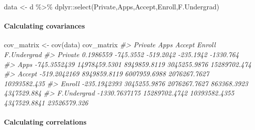 \documentclass[
]{article}
\newenvironment{Shaded}{\begin{snugshade}}{\end{snugshade}}
\newcommand{\CommentTok}[1]{\textcolor[rgb]{0.56,0.35,0.01}{\textit{#1}}}
\newcommand{\FunctionTok}[1]{\textcolor[rgb]{0.00,0.00,0.00}{#1}}
\newcommand{\NormalTok}[1]{#1}
\newcommand{\OtherTok}[1]{\textcolor[rgb]{0.56,0.35,0.01}{#1}}
\newcommand{\SpecialCharTok}[1]{\textcolor[rgb]{0.00,0.00,0.00}{#1}}
\newcommand{\StringTok}[1]{\textcolor[rgb]{0.31,0.60,0.02}{#1}}
\begin{document}
\begin{Shaded}
\begin{Highlighting}[]
\NormalTok{data }\OtherTok{\textless{}{-}}\NormalTok{ d }\SpecialCharTok{\%\textgreater{}\%}\NormalTok{ dplyr}\SpecialCharTok{::}\FunctionTok{select}\NormalTok{(}\StringTok{\textquotesingle{}Private\textquotesingle{}}\NormalTok{,}\StringTok{\textquotesingle{}Apps\textquotesingle{}}\NormalTok{,}\StringTok{\textquotesingle{}Accept\textquotesingle{}}\NormalTok{,}\StringTok{\textquotesingle{}Enroll\textquotesingle{}}\NormalTok{,}\StringTok{\textquotesingle{}F.Undergrad\textquotesingle{}}\NormalTok{)}
\end{Highlighting}
\end{Shaded}

\hypertarget{calculating-covariances}{%
\paragraph{Calculating covariances}\label{calculating-covariances}}

\begin{Shaded}
\begin{Highlighting}[]
\NormalTok{cov\_matrix }\OtherTok{\textless{}{-}} \FunctionTok{cov}\NormalTok{(data)}
\NormalTok{cov\_matrix}
\CommentTok{\#\textgreater{}                   Private          Apps        Accept       Enroll  F.Undergrad}
\CommentTok{\#\textgreater{} Private         0.1986559     {-}745.3552     {-}519.2042    {-}235.1942    {-}1330.764}
\CommentTok{\#\textgreater{} Apps         {-}745.3552439 14978459.5301  8949859.8119 3045255.9876 15289702.474}
\CommentTok{\#\textgreater{} Accept       {-}519.2042169  8949859.8119  6007959.6988 2076267.7627 10393582.435}
\CommentTok{\#\textgreater{} Enroll       {-}235.1942393  3045255.9876  2076267.7627  863368.3923  4347529.884}
\CommentTok{\#\textgreater{} F.Undergrad {-}1330.7637175 15289702.4742 10393582.4355 4347529.8841 23526579.326}
\end{Highlighting}
\end{Shaded}

\newpage

\hypertarget{calculating-correlations}{%
\paragraph{Calculating correlations}\label{calculating-correlations}}
\end{document}
